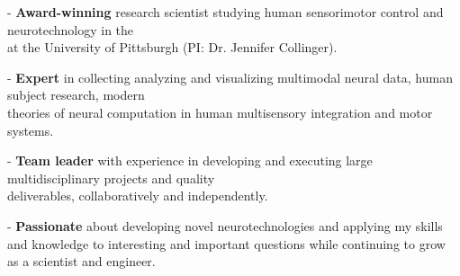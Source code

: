 \vspace*{-0.5cm}

\begin{cvparagraph}
- \textbf{Award-winning} research scientist studying human sensorimotor control and neurotechnology in the \\  at the University of Pittsburgh (PI: Dr. Jennifer Collinger). 

- \textbf{Expert} in collecting analyzing and visualizing multimodal neural data, human subject research, modern \\ theories of neural computation in human multisensory integration and motor systems.

- \textbf{Team leader} with experience in developing and executing large multidisciplinary projects and quality \\ deliverables, collaboratively and independently.

- \textbf{Passionate} about developing novel neurotechnologies and applying my skills and knowledge to interesting and important questions while continuing to grow as a scientist and engineer.
\vspace*{-0.6cm}
\end{cvparagraph}
